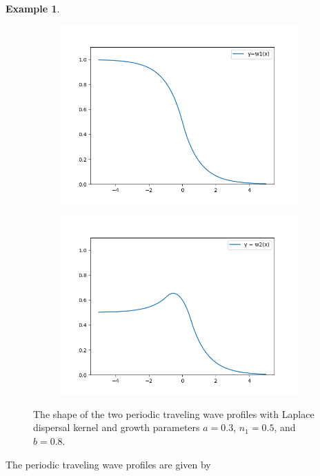 \documentclass[11pt]{article}
\theoremstyle{definition}
\newtheorem{ex}[thm]{Example}
\numberwithin{equation}{section}
\numberwithin{thm}{section}
\renewcommand{\a}{a}
\renewcommand{\b}{b}
\newcommand{\m}{n_1}
\begin{document}
\begin{ex}
\begin{figure}
\centering
\begin{subfigure}{.5\textwidth}
  \centering
  \includegraphics[width=.9\linewidth]{figures/fig2A.png}
  \label{fig:sub1}
\end{subfigure}%
\begin{subfigure}{.5\textwidth}
  \centering
  \includegraphics[width=.9\linewidth]{figures/fig2B.png}
  \label{fig:sub2}
\end{subfigure}
\caption{The shape of the two periodic traveling wave profiles with Laplace dispersal kernel and growth parameters $\a=0.3$, $\m=0.5$, and $\b=0.8$.}
\label{fig:test}
\end{figure}


The periodic traveling wave profiles are given by


\end{ex}
\end{document}

